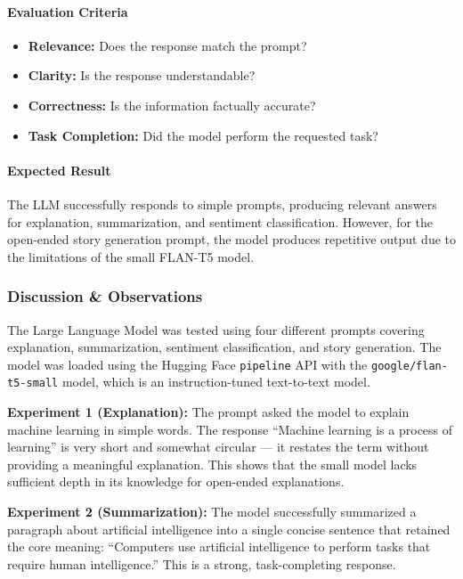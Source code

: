 \documentclass[a4paper,11pt]{article}
\begin{document}
\begin{itemize}
\paragraph{Evaluation Criteria}
\begin{itemize}
    \item \textbf{Relevance:} Does the response match the prompt?
    \item \textbf{Clarity:} Is the response understandable?
    \item \textbf{Correctness:} Is the information factually accurate?
    \item \textbf{Task Completion:} Did the model perform the requested task?
\end{itemize}

\paragraph{Expected Result}
The LLM successfully responds to simple prompts, producing relevant answers for explanation, summarization, and sentiment classification. However, for the open-ended story generation prompt, the model produces repetitive output due to the limitations of the small FLAN-T5 model.

\subsubsection{Discussion \& Observations}

The Large Language Model was tested using four different prompts covering explanation, summarization, sentiment classification, and story generation. The model was loaded using the Hugging Face \texttt{pipeline} API with the \texttt{google/flan-t5-small} model, which is an instruction-tuned text-to-text model.

\textbf{Experiment 1 (Explanation):} The prompt asked the model to explain machine learning in simple words. The response ``Machine learning is a process of learning'' is very short and somewhat circular --- it restates the term without providing a meaningful explanation. This shows that the small model lacks sufficient depth in its knowledge for open-ended explanations.

\textbf{Experiment 2 (Summarization):} The model successfully summarized a paragraph about artificial intelligence into a single concise sentence that retained the core meaning: ``Computers use artificial intelligence to perform tasks that require human intelligence.'' This is a strong, task-completing response.


\end{itemize}
\end{document}

